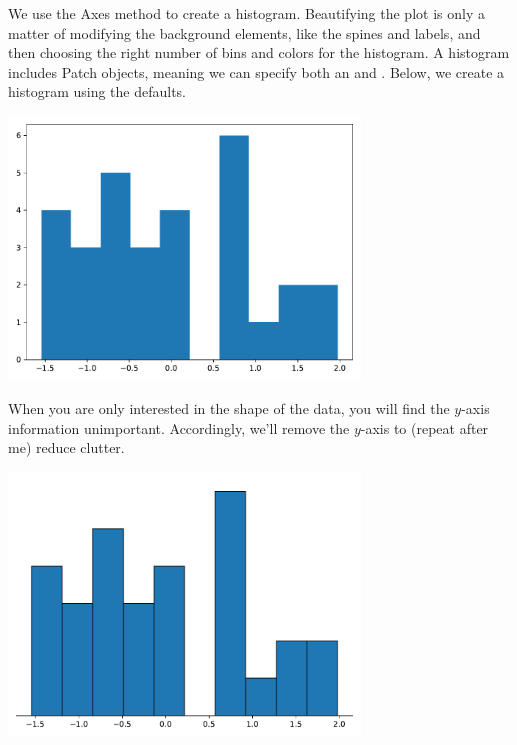 We use the  Axes method to create a histogram. Beautifying the plot is only a matter of modifying the background elements, like the spines and labels, and then choosing the right number of bins and colors for the histogram. A histogram includes Patch objects, meaning we can specify both an  and . Below, we create a histogram using the defaults. 


\begin{center}
    \includegraphics[width = 0.7\textwidth]{figures/specialplots/default-hist.pdf}
\end{center}

When you are only interested in the shape of the data, you will find the $y$-axis information unimportant. Accordingly, we'll remove the $y$-axis to (repeat after me) reduce clutter. 


\begin{center}
    \includegraphics[width = 0.7\textwidth]{figures/specialplots/clean-hist.pdf}
\end{center}

